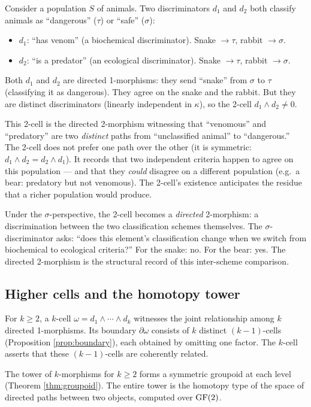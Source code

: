 \begin{example}
\label{ex:2morph}
Consider a population $S$ of animals. Two discriminators
$d_1$ and $d_2$ both classify animals as ``dangerous''
($\tau$) or ``safe'' ($\sigma$):
\begin{itemize}[nosep]
  \item $d_1$: ``has venom'' (a biochemical discriminator).
    Snake $\to \tau$, rabbit $\to \sigma$.
  \item $d_2$: ``is a predator'' (an ecological discriminator).
    Snake $\to \tau$, rabbit $\to \sigma$.
\end{itemize}

Both $d_1$ and $d_2$ are directed 1-morphisms: they send
``snake'' from $\sigma$ to $\tau$ (classifying it as
dangerous). They agree on the snake and the rabbit. But
they are distinct discriminators (linearly independent in
$\kappa$), so the 2-cell $d_1 \wedge d_2 \neq 0$.

This 2-cell is the directed 2-morphism witnessing that
``venomous'' and ``predatory'' are two \emph{distinct}
paths from ``unclassified animal'' to ``dangerous.'' The
2-cell does not prefer one path over the other (it is
symmetric: $d_1 \wedge d_2 = d_2 \wedge d_1$). It
records that two independent criteria happen to agree on
this population --- and that they \emph{could} disagree
on a different population (e.g.\ a bear: predatory but
not venomous). The 2-cell's existence anticipates the
residue that a richer population would produce.

Under the $\sigma$-perspective, the 2-cell becomes a
\emph{directed} 2-morphism: a discrimination between the
two classification schemes themselves. The
$\sigma$-discriminator asks: ``does this element's
classification change when we switch from biochemical to
ecological criteria?'' For the snake: no. For the bear:
yes. The directed 2-morphism is the structural record of
this inter-scheme comparison.
\end{example}

\subsection{Higher cells and the homotopy tower}

\begin{proposition}\label{prop:k-morph}
For $k \geq 2$, a $k$-cell
$\omega = d_1 \wedge \cdots \wedge d_k$ witnesses the
joint relationship among $k$ directed 1-morphisms. Its
boundary $\partial \omega$ consists of $k$ distinct
$(k-1)$-cells (Proposition \ref{prop:boundary}), each
obtained by omitting one factor. The $k$-cell asserts
that these $(k-1)$-cells are coherently related.

The tower of $k$-morphisms for $k \geq 2$ forms a
symmetric groupoid at each level (Theorem \ref{thm:groupoid}).
The entire tower is the homotopy type of the space of
directed paths between two objects, computed over $\operatorname{GF}(2)$.
\end{proposition}

